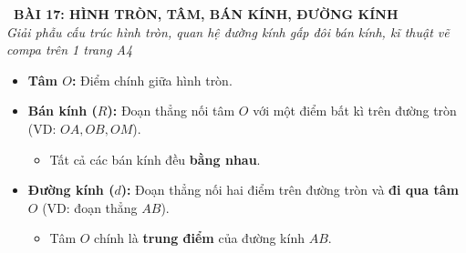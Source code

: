 \documentclass[12pt,a4paper]{article}
\begin{document}
\begin{tcolorbox}[
  enhanced,
  colback=teal!8!white,
  colframe=teal!70!black,
  arc=3mm, boxrule=1.2pt,
  left=3mm, right=3mm, top=2mm, bottom=2mm,
  halign=center
]
  {\LARGE\bfseries\color{teal!90!black}\faBookmark\ BÀI 17: HÌNH TRÒN, TÂM, BÁN KÍNH, ĐƯỜNG KÍNH}\\[1mm]
  {\itshape\footnotesize\color{black!75} Giải phẫu cấu trúc hình tròn, quan hệ đường kính gấp đôi bán kính, kĩ thuật vẽ compa trên 1 trang A4}
\end{tcolorbox}

\vspace{-2mm}

\noindent
\begin{minipage}[t]{0.49\textwidth}\vspace{0pt}
\begin{tcolorbox}[
  enhanced,
  colback=blue!4!white,
  colframe=blue!75!black,
  arc=2mm, boxrule=0.8pt,
  left=2mm, right=2mm, top=1.8mm, bottom=1.8mm,
  title={\footnotesize\bfseries\color{white}\faDotCircleO\ 1. Tâm, Bán kính \& Đường kính}
]
{\footnotesize
\begin{itemize}\setlength{\itemsep}{1pt}\setlength{\leftskip}{-2.5mm}
  \item \textbf{Tâm $O$:} Điểm chính giữa hình tròn.
  \item \textbf{Bán kính ($R$):} Đoạn thẳng nối tâm $O$ với một điểm bất kì trên đường tròn (VD: $OA, OB, OM$).
  \begin{itemize}\setlength{\itemsep}{0.5pt}\setlength{\leftskip}{-2.5mm}
    \item Tất cả các bán kính đều \textbf{bằng nhau}.
  \end{itemize}
  \item \textbf{Đường kính ($d$):} Đoạn thẳng nối hai điểm trên đường tròn và \textbf{đi qua tâm $O$} (VD: đoạn thẳng $AB$).
  \begin{itemize}\setlength{\itemsep}{0.5pt}\setlength{\leftskip}{-2.5mm}
    \item Tâm $O$ chính là \textbf{trung điểm} của đường kính $AB$.
  \end{itemize}
\end{itemize}
}
\end{tcolorbox}
\end{minipage}
\hfill
\end{document}
